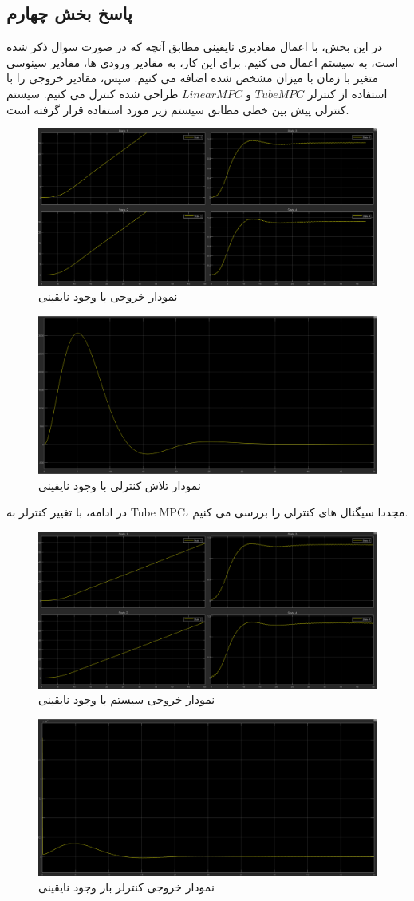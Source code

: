 \subsection*{پاسخ بخش چهارم}
در این بخش، با اعمال مقادیری نایقینی مطابق آنچه که در صورت سوال ذکر شده است، به سیستم اعمال می کنیم. برای این کار، به مقادیر ورودی ها، مقادیر سینوسی متغیر با زمان با میزان مشخص شده اضافه می کنیم. سپس، مقادیر خروجی را با استفاده از کنترلر $Tube MPC$ و $Linear MPC$ طراحی شده کنترل می کنیم. 
سیستم کنترلی پیش بین خطی مطابق سیستم زیر مورد استفاده قرار گرفته است.
\begin{figure}[H]
	\centering
	\includegraphics[width=0.7\linewidth]{../img/Q4_Uncertainty_Responce_LinearMPC}
	\caption{نمودار خروجی با وجود نایقینی}
	\label{fig:q4uncertaintyresponcelinearmpc}
\end{figure}
\begin{figure}[H]
	\centering
	\includegraphics[width=0.7\linewidth]{../img/Q4_Uncertainty_Ceffort_LinearMPC}
	\caption{نمودار تلاش کنترلی با وجود نایقینی}
	\label{fig:q4uncertaintyceffortlinearmpc}
\end{figure}
در ادامه، با تغییر کنترلر به Tube MPC، مجددا سیگنال های کنترلی را بررسی می کنیم.
\begin{figure}[H]
	\centering
	\includegraphics[width=0.7\linewidth]{../img/Q4_Uncertainty_Responce_TubeMPC}
	\caption{نمودار خروجی سیستم با وجود نایقینی}
	\label{fig:q4uncertaintyresponcetubempc}
\end{figure}
\begin{figure}[H]
	\centering
	\includegraphics[width=0.7\linewidth]{../img/Q4_Uncertainty_Ceffort_TubeMPC}
	\caption{نمودار خروجی کنترلر بار وجود نایقینی}
	\label{fig:q4uncertaintycefforttubempc}
\end{figure}


